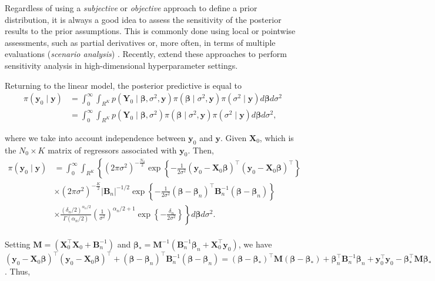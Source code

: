 Regardless of using a \textit{subjective} or \textit{objective} approach to define a prior distribution, it is always a good idea to assess the sensitivity of the posterior results to the prior assumptions. This is commonly done using local or pointwise assessments, such as partial derivatives \cite{giordano2022evaluating,Jacobi2022,gustafson2000local} or, more often, in terms of multiple evaluations (\textit{scenario analysis}) \cite{richardson1997bayesian, kim1999has, an2007bayesian}. Recently, \cite{jacobi2024posterior} extend these approaches to perform sensitivity analysis in high-dimensional hyperparameter settings. 

Returning to the linear model, the posterior predictive is equal to
\begin{align*}
	\pi({\bm{y}}_0\mid {\bm{y}})&=\int_{0}^{\infty}\int_{R^K}p({\bm{Y}}_0\mid \bm{\beta},\sigma^2,{\bm{y}})\pi(\bm{\beta}\mid \sigma^2,{\bm{y}})\pi(\sigma^2\mid {\bm{y}})d\bm{\beta} d\sigma^2\\
	&=\int_{0}^{\infty}\int_{R^K}p({\bm{Y}}_0\mid \bm{\beta},\sigma^2)\pi(\bm{\beta}\mid \sigma^2,{\bm{y}})\pi(\sigma^2\mid {\bm{y}})d\bm{\beta} d\sigma^2,
\end{align*}

where we take into account independence between ${\bm{y}}_0$ and ${\bm{y}}$. Given ${\bm{X}}_0$, which is the $N_0\times K$ matrix of regressors associated with ${\bm{y}}_0$. Then,
\begin{align*}
	\pi({\bm{y}}_0\mid {\bm{y}})&=\int_{0}^{\infty}\int_{R^K}\left\{ (2\pi\sigma^2)^{-\frac{N_0}{2}} \exp \left\{-\frac{1}{2\sigma^2} ({\bm{y}}_0 - {\bm{X}}_0\bm{\beta})^{\top}({\bm{y}}_0 - {\bm{X}}_0\bm{\beta})^{\top} \right\}\right. \\
	& \times (2\pi\sigma^2)^{-\frac{K}{2}} |{\bm{B}}_n|^{-1/2} \exp \left\{-\frac{1}{2\sigma^2} (\bm{\beta} - \bm{\beta}_n)^{\top}{\bm{B}}_n^{-1}(\bm{\beta} - \bm{\beta}_n)\right\} \\
	& \left. \times \frac{(\delta_n/2)^{\alpha_n/2}}{\Gamma(\alpha_n/2)}\left(\frac{1}{\sigma^2}\right)^{\alpha_n/2+1}\exp \left\{-\frac{\delta_n}{2\sigma^2} \right\}\right\}d\bm{\beta} d\sigma^2. \\
\end{align*}

Setting ${\bm{M}}=({\bm{X}}_0^{\top}{\bm{X}}_0+{\bm{B}}_n^{-1})$ and $\bm{\beta}_*={\bm{M}}^{-1}({\bm{B}}_n^{-1}\bm{\beta}_n+{\bm{X}}_0^{\top}{\bm{y}}_0)$, we have
$({\bm{y}}_0 - {\bm{X}}_0\bm{\beta})^{\top}({\bm{y}}_0 - {\bm{X}}_0\bm{\beta})^{\top}+(\bm{\beta} - \bm{\beta}_n)^{\top}{\bm{B}}_n^{-1}(\bm{\beta} - \bm{\beta}_n)=(\bm{\beta} - \bm{\beta}_*)^{\top}{\bm{M}}(\bm{\beta} - \bm{\beta}_*)+\bm{\beta}_n^{\top}{\bm{B}}_n^{-1}\bm{\beta}_n+{\bm{y}}_0^{\top}{\bm{y}}_0-\bm{\beta}_*^{\top}{\bm{M}}\bm{\beta}_*$.
Thus, 

